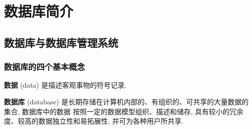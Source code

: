 \documentclass[10pt,UTF8]{book} %
\begin{document}
\makeatletter
\let\ps@plain\ps@empty
\makeatother

\mainmatter
\chapter{数据库简介}


\section{数据库与数据库管理系统}

\subsection{数据库的四个基本概念}

\textbf{数据} (data) 是描述客观事物的符号记录.



\textbf{数据库} (database) 
是长期存储在计算机内部的、有组织的、可共享的大量数据的集合, 数据库中的数据
按照一定的数据模型组织、描述和储存, 具有较小的冗余度、较高的数据独立性和易拓展性,
并可为各种用户所共享.

\end{document}
